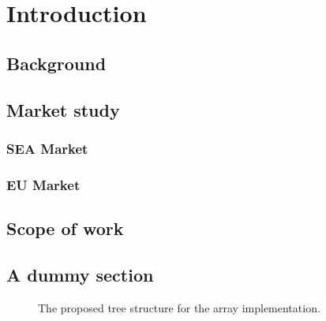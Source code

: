 %
%
\chapter{Introduction}

\section{Background}

\section{Market study}

\subsection{SEA Market}

\subsection{EU Market}

\section{Scope of work}

\section{A dummy section}

\begin{figure}[!h]
	\centering
	\caption{The proposed tree structure for the array implementation.}
\end{figure}


\clearpage
